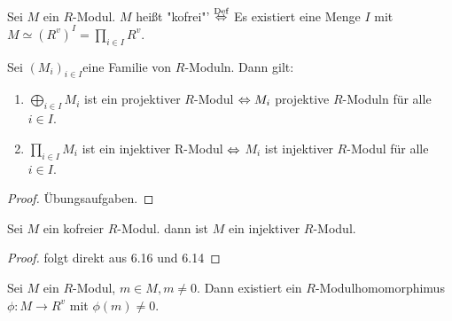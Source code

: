 \begin{df}
	Sei $M$ ein $R$-Modul. $M$ heißt "kofrei"' $\overset{\text{Def}}{\Leftrightarrow}$ Es existiert eine Menge $ I$ mit $M \simeq (R^{v})^I = \prod_{i \in I} R^{v} $.
\end{df}
\begin{bem}
	Sei $(M_i)_{i \in I} $eine Familie von $R$-Moduln. Dann gilt:
	\begin{enumerate} [label= \alph*)]
		\item $\bigoplus_{i \in I} M_i $ ist ein projektiver $R$-Modul $\Leftrightarrow M_i $ projektive $R$-Moduln für alle $ i \in I $.
		\item $\prod_{i \in I} M_i $ ist ein injektiver R-Modul $\Leftrightarrow$ $M_i $ ist injektiver $R$-Modul für alle $i  \in I $.
	\end{enumerate}
\end{bem}
\begin{proof}
	Übungsaufgaben.
\end{proof}
\begin{sa}
	Sei $M$ ein kofreier $R$-Modul. dann ist $M$ ein injektiver $R$-Modul. 
\end{sa}
\begin{proof}
	folgt direkt aus 6.16 und 6.14
\end{proof}
\begin{bem}
	Sei $M$ ein $R$-Modul, $m \in M , m \neq 0 $. Dann existiert ein $R$-Modulhomomorphimus $\phi: M \to R^{v} $ mit $\phi(m) \neq 0.$
\end{bem}
